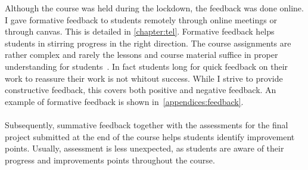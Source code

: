 Although the course was held during the lockdown, the feedback was done online. I gave formative feedback to students remotely through online meetings or through \gls{canvas}. This is detailed in  \cref{chapter:tel}.
Formative feedback helps students in stirring progress in the right direction. The course assignments are rather complex and rarely the lessons and course material suffice in proper understanding for students~\cite{feedbackFHICT}. In fact students long for quick feedback on their work to reassure their work is not whitout success. While I strive to provide constructive feedback, this covers both positive and negative feedback. An example of formative feedback is shown in~\cref{appendices:feedback}.\\\\
Subsequently, summative feedback together with the assessments for the final project submitted at the end of the course helps students identify improvement points. Usually, assessment is less unexpected, as students are aware of their progress and improvements points throughout the course.